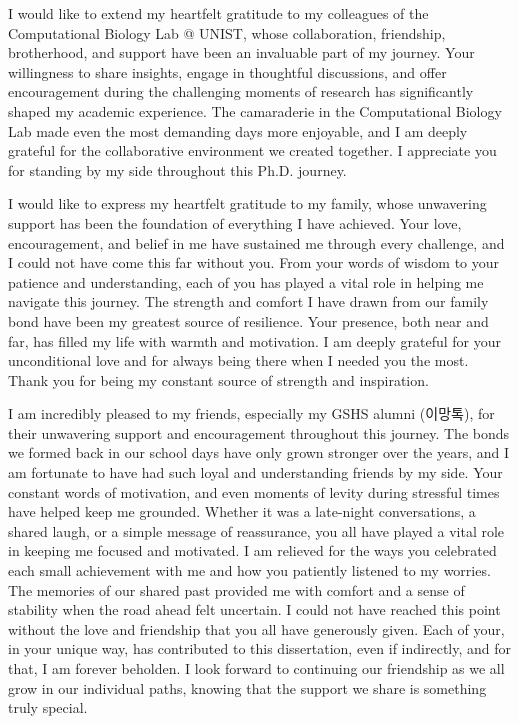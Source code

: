 \documentclass[11pt, a4paper, onecolumn, oneside]{report}
\begin{document}
        I would like to extend my heartfelt gratitude to my colleagues of the Computational Biology Lab @ UNIST, whose collaboration, friendship, brotherhood, and support have been an invaluable part of my journey. Your willingness to share insights, engage in thoughtful discussions, and offer encouragement during the challenging moments of research has significantly shaped my academic experience. The camaraderie in the Computational Biology Lab made even the most demanding days more enjoyable, and I am deeply grateful for the collaborative environment we created together. I appreciate you for standing by my side throughout this Ph.D. journey.

        I would like to express my heartfelt gratitude to my family, whose unwavering support has been the foundation of everything I have achieved. Your love, encouragement, and belief in me have sustained me through every challenge, and I could not have come this far without you. From your words of wisdom to your patience and understanding, each of you has played a vital role in helping me navigate this journey. The strength and comfort I have drawn from our family bond have been my greatest source of resilience. Your presence, both near and far, has filled my life with warmth and motivation. I am deeply grateful for your unconditional love and for always being there when I needed you the most. Thank you for being my constant source of strength and inspiration.

        I am incredibly pleased to my friends, especially my GSHS alumni (이망톡), for their unwavering support and encouragement throughout this journey. The bonds we formed back in our school days have only grown stronger over the years, and I am fortunate to have had such loyal and understanding friends by my side. Your constant words of motivation, and even moments of levity during stressful times have helped keep me grounded. Whether it was a late-night conversations, a shared laugh, or a simple message of reassurance, you all have played a vital role in keeping me focused and motivated. I am relieved for the ways you celebrated each small achievement with me and how you patiently listened to my worries. The memories of our shared past provided me with comfort and a sense of stability when the road ahead felt uncertain. I could not have reached this point without the love and friendship that you all have generously given. Each of your, in your unique way, has contributed to this dissertation, even if indirectly, and for that, I am forever beholden. I look forward to continuing our friendship as we all grow in our individual paths, knowing that the support we share is something truly special.
\end{document}
